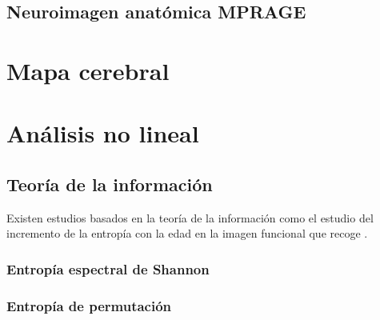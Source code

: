 \subsection{Neuroimagen anatómica MPRAGE}
\section{Mapa cerebral}
\section{Análisis no lineal}
\subsection{Teoría de la información}
Existen estudios basados en la teoría de la información como el estudio del incremento de la entropía con la edad en la imagen funcional que recoge \cite{Yao2013}.
\subsubsection{Entropía espectral de Shannon}
\subsubsection{Entropía de permutación}